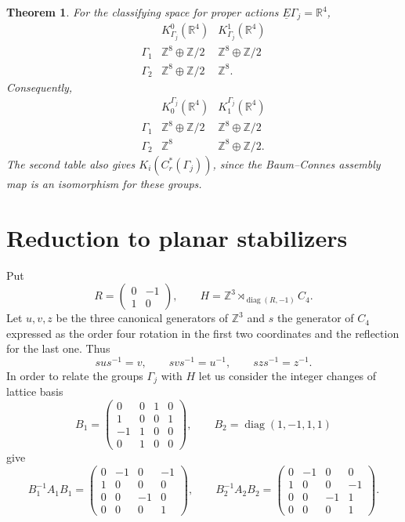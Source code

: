 \documentclass[11pt]{amsart}
\newcommand{\Z}{\mathbb Z}
\newcommand{\R}{\mathbb R}
\newcommand{\diag}{\operatorname{diag}}
\newtheorem{theorem}{Theorem}[section]
\theoremstyle{remark}
\numberwithin{equation}{section}
\begin{document}
\begin{theorem}\label{thm:main}
For the classifying space for proper actions $\underline E\Gamma_j=\R^4$,
\begin{equation}\label{eq:cohom-results}
\begin{array}{c|cc}
 &K^0_{\Gamma_j}(\R^4)&K^1_{\Gamma_j}(\R^4)\\ \hline
 \Gamma_1&\Z^8\oplus\Z/2&\Z^8\oplus\Z/2\\
 \Gamma_2&\Z^8\oplus\Z/2&\Z^8.
\end{array}
\end{equation}
Consequently,
\begin{equation}\label{eq:hom-results}
\begin{array}{c|cc}
 &K_0^{\Gamma_j}(\R^4)&K_1^{\Gamma_j}(\R^4)\\ \hline
 \Gamma_1&\Z^8\oplus\Z/2&\Z^8\oplus\Z/2\\
 \Gamma_2&\Z^8&\Z^8\oplus\Z/2.
\end{array}
\end{equation}
The second table also gives $K_i(C_r^*(\Gamma_j))$, since the
Baum--Connes assembly map is an isomorphism for these groups.
\end{theorem}

\section{Reduction to planar stabilizers}

Put
\[
 R=\begin{pmatrix}0&-1\\1&0\end{pmatrix},\qquad
 H=\Z^3\rtimes_{\diag(R,-1)}C_4.
\]
Let $u,v,z$ be the three canonical generators of $\Z^3$ and $s$ the generator of $C_4$ expressed as the order four rotation in the first two coordinates and the reflection for the last one. Thus
\[
 sus^{-1}=v,\qquad svs^{-1}=u^{-1},\qquad szs^{-1}=z^{-1}.
\]
In order to relate the groups $\Gamma_j$ with $H$ let us consider the integer changes of lattice basis
\[
 B_1=\begin{pmatrix}0&0&1&0\\1&0&0&1\\-1&1&0&0\\0&1&0&0\end{pmatrix},
 \qquad B_2=\diag(1,-1,1,1)
\]
give
\[
 B_1^{-1}A_1B_1=
 \begin{pmatrix}0&-1&0&-1\\1&0&0&0\\0&0&-1&0\\0&0&0&1\end{pmatrix},
 \qquad
 B_2^{-1}A_2B_2=
 \begin{pmatrix}0&-1&0&0\\1&0&0&-1\\0&0&-1&1\\0&0&0&1\end{pmatrix}.
\]
\end{document}
